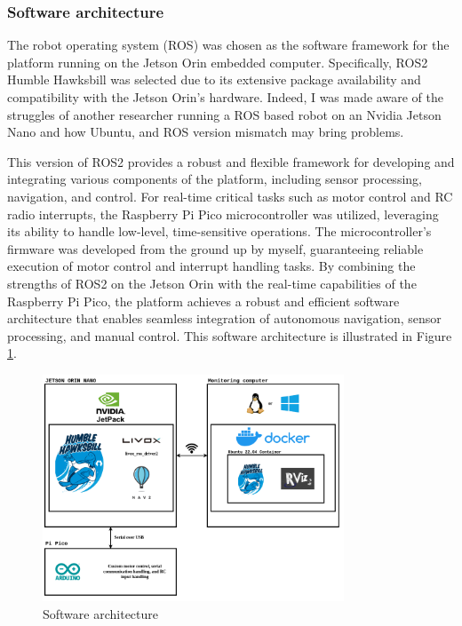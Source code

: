 \documentclass[12pt]{article}
\begin{document}
        
        
        \subsubsection{Software architecture}


        The robot operating system (ROS) was chosen as the software framework for the platform running on the Jetson Orin embedded computer. Specifically, ROS2 Humble Hawksbill was selected due to its extensive package availability and compatibility with the Jetson Orin's hardware. Indeed, I was made aware of the struggles of another researcher running a ROS based robot on an Nvidia Jetson Nano and how Ubuntu, and ROS version mismatch may bring problems. 
        
        This version of ROS2 provides a robust and flexible framework for developing and integrating various components of the platform, including sensor processing, navigation, and control. For real-time critical tasks such as motor control and RC radio interrupts, the Raspberry Pi Pico microcontroller was utilized, leveraging its ability to handle low-level, time-sensitive operations. The microcontroller's firmware was developed from the ground up by myself, guaranteeing reliable execution of motor control and interrupt handling tasks. By combining the strengths of ROS2 on the Jetson Orin with the real-time capabilities of the Raspberry Pi Pico, the platform achieves a robust and efficient software architecture that enables seamless integration of autonomous navigation, sensor processing, and manual control. This software architecture is illustrated in Figure \ref{fig:SW_architecture}.

        \begin{figure}[H]
            \centering
            \includegraphics[width=0.8\textwidth]{Images/Software architecture rover.drawio.png}
            \caption{Software architecture}
            \label{fig:SW_architecture}
        \end{figure}
\end{document}
